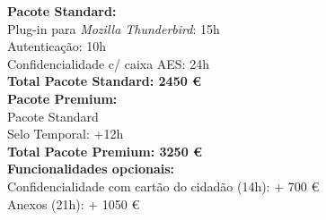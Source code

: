\documentclass[times, 10pt,twocolumn]{article}
\begin{document}
\textbf{Pacote Standard:} \\
\indent \indent Plug-in para \emph{Mozilla Thunderbird}: 15h\\
\indent \indent Autentica\c{c}\~ao: 10h \\
\indent \indent Confidencialidade c/ caixa AES: 24h \\

\textbf{Total Pacote Standard: 2450 \euro} \\

\textbf{Pacote Premium:} \\
 \indent \indent Pacote Standard\\
 \indent \indent Selo Temporal: +12h\\

\textbf{Total Pacote Premium: 3250 \euro} \\

\indent \textbf{Funcionalidades opcionais:}\\
\indent \indent Confidencialidade com cart\~ao do cidad\~ao (14h): + 700 \euro \\
\indent \indent Anexos (21h): + 1050 \euro \\



\nocite{ex1,ex2}


\end{document}
